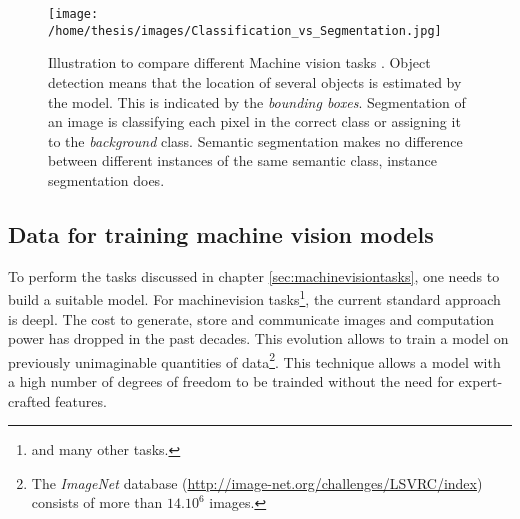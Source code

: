 \begin{SCfigure}[][h!]
    \centering
    \texttt{[image: /home/thesis/images/Classification\_vs\_Segmentation.jpg]}
    \caption{Illustration to compare different Machine vision tasks \cite{SemTorch76:online}. 
    Object detection means that the location of several objects is estimated by the model. This is indicated by the \textit{bounding boxes}.
    Segmentation of an image is classifying each pixel in the correct class or assigning it to the \textit{background} class.
    Semantic segmentation makes no difference between different instances of the same semantic class, instance segmentation does.
    \label{fig:machinevisiontasks}}
\end{SCfigure}


\subsection{Data for training machine vision models}
\par{
    To perform the tasks discussed in chapter \ref{sec:machinevisiontasks}, one needs to build a suitable model.
    For \Gls{machinevision} tasks\footnote{and many other tasks.}, the current standard approach is \Gls{deepl}.
    The cost to generate, store and communicate images and computation power has dropped in the past decades.
    This evolution allows to train a model  on previously unimaginable quantities of data\footnote{The \textit{ImageNet} database (\url{http://image-net.org/challenges/LSVRC/index}) consists of more than $14.10^6$ images.}.
    This technique allows a model with a high number of degrees of freedom to be trainded without the need for expert-crafted \Gls{features}. 
}
